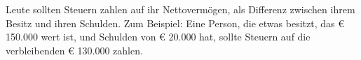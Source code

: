 Leute sollten Steuern zahlen auf ihr Nettovermögen, als Differenz zwischen ihrem Besitz und ihren Schulden.
Zum Beispiel: Eine Person, die etwas besitzt, das € 150.000 wert ist, und Schulden von € 20.000 hat, sollte Steuern auf die verbleibenden € 130.000 zahlen.